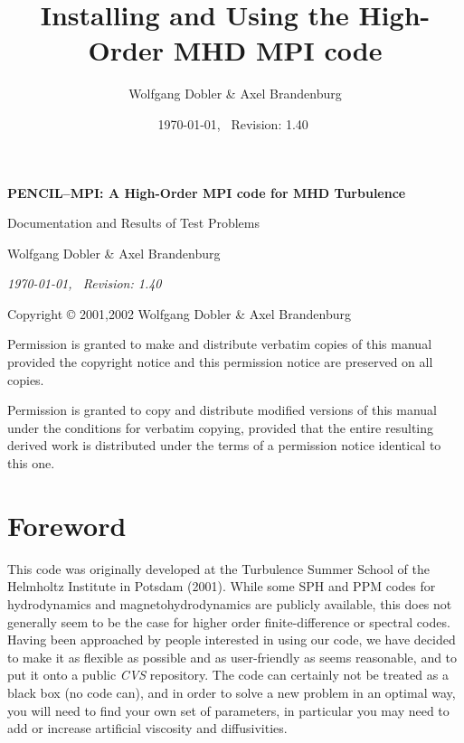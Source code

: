 \documentclass[12pt,twoside,notitlepage,a4paper]{article}
\title{{\sffamily\bfseries Installing and Using the High-Order MHD MPI code}}
\author{Wolfgang Dobler \& Axel Brandenburg}
\date{\today,~ $ $Revision: 1.40 $ $}
\newcommand{\name}[1]{\textsl{#1}\index{#1}\/}
\begin{document}
\pagestyle{empty}


\begin{titlepage}
  \begin{center}

  \large

  \vspace*{3cm}

  {\Large\sffamily\bfseries PENCIL--MPI: A High-Order MPI code for MHD Turbulence}

  \vspace{0.5cm}

  {\sffamily Documentation and Results of Test Problems}

  \vspace{1.5cm}

  {Wolfgang Dobler \& Axel Brandenburg}


  \vspace{2cm}

  \emph{\today,~ $ $Revision: 1.40 $ $}


\end{center}

\end{titlepage}


\newpage
\mbox{}
\vfill

Copyright \copyright{} 2001,2002 Wolfgang Dobler \& Axel Brandenburg
\bigskip

Permission is granted to make and distribute verbatim copies of
this manual provided the copyright notice and this permission notice
are preserved on all copies.

Permission is granted to copy and distribute modified versions
of this manual under the conditions for verbatim copying,
provided that the entire resulting derived work is distributed under the
terms of a permission notice identical to this one.


\clearpage
\pagestyle{plain}

\section*{Foreword}

This code was originally developed at the Turbulence Summer School of the
Helmholtz Institute in Potsdam (2001).
While some SPH and PPM codes for hydrodynamics and magnetohydrodynamics
are publicly available, this does not generally seem to be
the case for higher order finite-difference or spectral codes.
Having been approached by people interested in using our code, we have
decided to make it as flexible as possible and as user-friendly as seems
reasonable, and to put it onto a public \name{CVS} repository.
The code can certainly not be treated as a black box (no code can), and in
order to solve a new problem in an optimal way, you will need to find your
own set of parameters, in particular you may need to add or increase
artificial viscosity and diffusivities.
\end{document}
